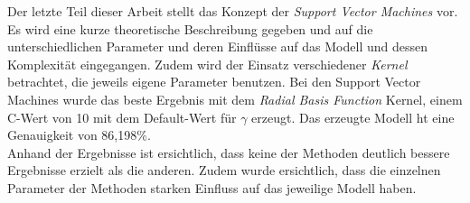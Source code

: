 \noindent \hspace*{7mm}
Der letzte Teil dieser Arbeit stellt das Konzept der \emph{Support Vector Machines} vor. Es wird eine kurze theoretische Beschreibung gegeben und auf die unterschiedlichen Parameter und deren Einflüsse auf das Modell und dessen Komplexität eingegangen. Zudem wird der Einsatz verschiedener \emph{Kernel} betrachtet, die jeweils eigene Parameter benutzen. Bei den Support Vector Machines wurde das beste Ergebnis mit dem \emph{Radial Basis Function} Kernel, einem C-Wert von 10 mit dem Default-Wert für $\gamma$ erzeugt. Das erzeugte Modell ht eine Genauigkeit von 86,198\%.\\
\noindent \hspace*{7mm}
Anhand der Ergebnisse ist ersichtlich, dass keine der Methoden deutlich bessere Ergebnisse erzielt als die anderen. Zudem wurde ersichtlich, dass die einzelnen Parameter der Methoden starken Einfluss auf das jeweilige Modell haben.